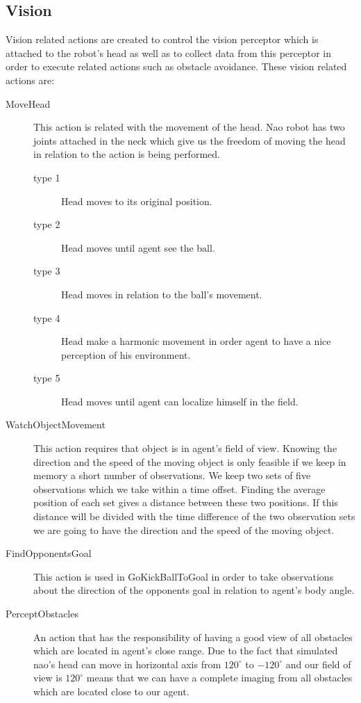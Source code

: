 \subsection{Vision}
Vision related actions are created to control the vision perceptor which is attached to the robot's head as well as to collect data from this perceptor in order to execute related actions such as obstacle avoidance. These vision related actions are:
\begin{description}
 \item[MoveHead] This action is related with the movement of the head. Nao robot has two joints attached in the neck which give us the freedom of moving the head in relation to the action is being performed.
 \begin{description}
 \item[type 1] Head moves to its original position.
 \item[type 2] Head moves until agent see the ball.
 \item[type 3] Head moves in relation to the ball's movement.
 \item[type 4] Head make a harmonic movement in order agent to have a nice perception of his environment.
 \item[type 5] Head moves until agent can localize himself in the field.
 \end{description}
 \item[WatchObjectMovement] This action requires that object is in agent's field of view. Knowing the direction and the speed of the moving object is only feasible if we keep in memory a short number of observations. We keep two sets of five observations which we take within a time offset. Finding the average position of each set gives a distance between these two positions. If this distance will be divided with the time difference of the two observation sets we are going to have the direction and the speed of the moving object.
 \item[FindOpponentsGoal]This action is used in GoKickBallToGoal in order to take observations about the direction of the opponents goal in relation to agent's body angle.
 \item[PerceptObstacles]
 An action that has the responsibility of having a good view of all obstacles which are located in agent's close range. Due to the fact that simulated nao's head can move in horizontal axis from $120^{\circ}$ to $-120^{\circ}$ and our field of view is $120^{\circ}$ means that we can have a complete imaging from all obstacles which are located close to our agent.

\end{description}
